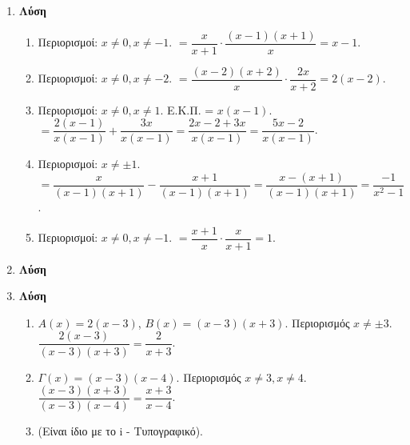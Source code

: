 \documentclass[11pt,a4paper,modern]{FFExercises}
\begin{document}
\begin{enumerate}[resume]
\begin{center}
\textbf{ΣΥΝΘΕΤΕΣ ΑΣΚΗΣΕΙΣ}
\end{center}

\item \textbf{Λύση}
\begin{enumerate}
\item Περιορισμοί: $x \neq 0, x \neq -1$.
$= \dfrac{x}{x+1} \cdot \dfrac{(x-1)(x+1)}{x} = x-1$.
\item Περιορισμοί: $x \neq 0, x \neq -2$.
$= \dfrac{(x-2)(x+2)}{x} \cdot \dfrac{2x}{x+2} = 2(x-2)$.
\item Περιορισμοί: $x \neq 0, x \neq 1$.
Ε.Κ.Π. = $x(x-1)$.
$= \dfrac{2(x-1)}{x(x-1)} + \dfrac{3x}{x(x-1)} = \dfrac{2x-2+3x}{x(x-1)} = \dfrac{5x-2}{x(x-1)}$.
\item Περιορισμοί: $x \neq \pm 1$.
$= \dfrac{x}{(x-1)(x+1)} - \dfrac{x+1}{(x-1)(x+1)} = \dfrac{x-(x+1)}{(x-1)(x+1)} = \dfrac{-1}{x^2-1}$.
\item Περιορισμοί: $x \neq 0, x \neq -1$.
$= \dfrac{x+1}{x} \cdot \dfrac{x}{x+1} = 1$.
\end{enumerate}

\item \textbf{Λύση}

\item \textbf{Λύση}
\begin{enumerate}
\item $A(x) = 2(x-3)$, $B(x)=(x-3)(x+3)$. Περιορισμός $x \neq \pm 3$.
$\dfrac{2(x-3)}{(x-3)(x+3)} = \dfrac{2}{x+3}$.
\item $\varGamma(x) = (x-3)(x-4)$. Περιορισμός $x \neq 3, x \neq 4$.
$\dfrac{(x-3)(x+3)}{(x-3)(x-4)} = \dfrac{x+3}{x-4}$.
\item (Είναι ίδιο με το i - Τυπογραφικό).
\end{enumerate}


\end{enumerate}
\end{document}
